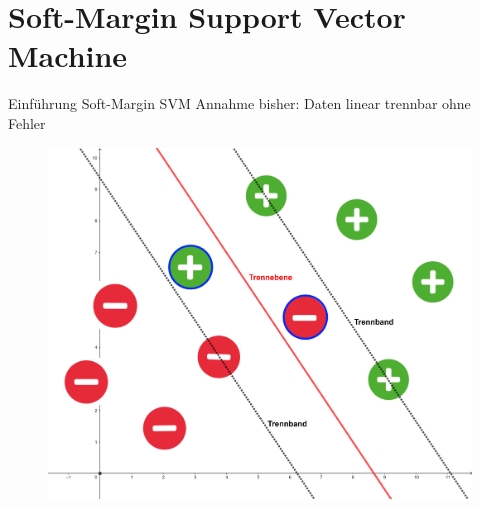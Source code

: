 \documentclass[ngerman]{beamer}
\begin{document}
\section{Soft-Margin Support Vector Machine}

\begin{frame}{Einführung Soft-Margin SVM}
	Annahme bisher: Daten linear trennbar ohne Fehler \\
	
	\begin{center}
		\begin{figure}
			\includegraphics[width=\textwidth,height=0.7\textheight,keepaspectratio]{assets/soft_margin_example.png}
		\end{figure}
	\end{center}
\end{frame}
\end{document}
